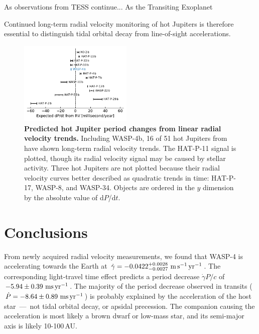 \documentclass[12pt,twocolumn,tighten]{aastex62}
\begin{document}
As observations from TESS continue...
As the Transiting Exoplanet 

Continued long-term radial
  velocity monitoring of hot Jupiters is therefore essential to
  distinguish tidal orbital decay from line-of-sight accelerations.


\begin{figure}[t]
	\begin{center}
		\leavevmode
		\includegraphics[width=0.48\textwidth]{f5.pdf}
	\end{center}
	\vspace{-0.7cm}
	\caption{
  {\bf Predicted hot Jupiter period changes from linear radial
  velocity trends.} Including WASP-4b, 16 of 51 hot Jupiters from
  \citet{knutson_friends_2014} have shown long-term radial velocity
  trends.  The HAT-P-11 signal is plotted, though its radial velocity
  signal may be caused by stellar activity.  Three hot Jupiters are
  not plotted because their radial velocity curves better described as
  quadratic trends in time: HAT-P-17, WASP-8, and WASP-34.  Objects
  are ordered in the $y$ dimension by the absolute value of d$P$/d$t$.
	\label{fig:pdot_pop}
  \vspace{-0.3cm}
	}
\end{figure}


\section{Conclusions}
\label{sec:conclusions}

From newly acquired radial velocity
measurements, we found that WASP-4 is accelerating towards the Earth at
$\dot{\gamma} = -0.0422^{+0.0028}_{-0.0027}\ {\rm m}\,{\rm
s}^{-1}\,{\rm yr}^{-1}$.  The corresponding light-travel time effect
predicts a period decrease $\dot{\gamma} P/c$ of $-5.94 \pm 0.39~{\rm
ms}\,{\rm yr}^{-1}$.  The majority of the period decrease observed in
transits ($\dot{P}= - 8.64 \pm 0.89~{\rm ms}\,{\rm yr}^{-1}$) is
probably explained by the acceleration of the host star~---~not tidal
orbital decay, or apsidal precession.  The companion causing the
acceleration is most likely a brown dwarf or low-mass star, and its
semi-major axis is likely 10-100$\,$AU.
\end{document}
